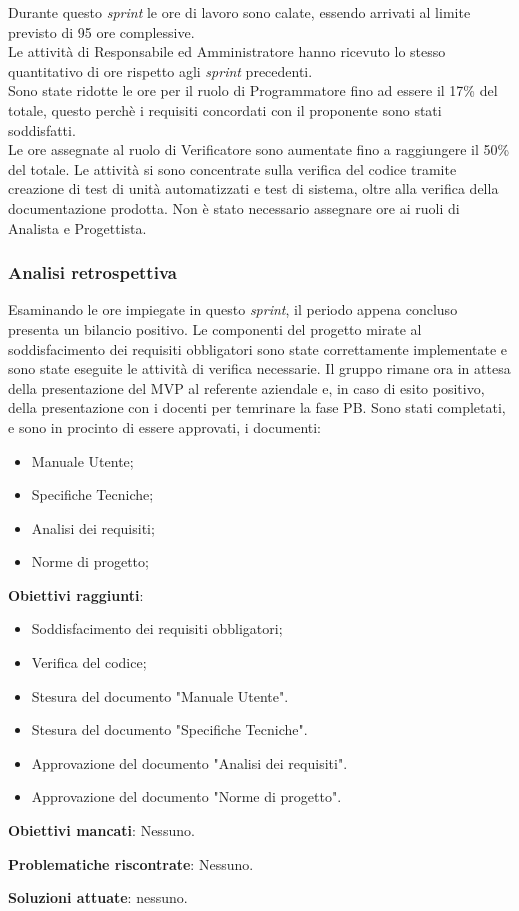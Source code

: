 Durante questo \textit{sprint} le ore di lavoro sono calate, essendo arrivati al limite previsto di 95 ore complessive.\\
Le attività di Responsabile ed Amministratore hanno ricevuto lo stesso quantitativo di ore rispetto agli \textit{sprint} precedenti.\\
Sono state ridotte le ore per il ruolo di Programmatore fino ad essere il 17\% del totale, questo perchè i requisiti concordati con il proponente sono stati soddisfatti.\\
Le ore assegnate al ruolo di Verificatore sono aumentate fino a raggiungere il 50\% del totale.
Le attività si sono concentrate sulla verifica del codice tramite creazione di test di unità automatizzati e test di sistema, oltre alla verifica della documentazione prodotta.
Non è stato necessario assegnare ore ai ruoli di Analista e Progettista.

\subsubsection{Analisi retrospettiva}
Esaminando le ore impiegate in questo \textit{sprint}, il periodo appena concluso presenta un bilancio positivo.
Le componenti del progetto mirate al soddisfacimento dei requisiti obbligatori sono state correttamente implementate e sono state eseguite le attività di verifica necessarie.
Il gruppo rimane ora in attesa della presentazione del MVP al referente aziendale e, in caso di esito positivo, della presentazione con i docenti per temrinare la fase PB.
Sono stati completati, e sono in procinto di essere approvati, i documenti:
\begin{itemize}
	\item Manuale Utente;
	\item Specifiche Tecniche;
	\item Analisi dei requisiti;
	\item Norme di progetto;
\end{itemize}


\textbf{Obiettivi raggiunti}:
\begin{itemize}
	\item Soddisfacimento dei requisiti obbligatori;
	\item Verifica del codice;
	\item Stesura del documento "Manuale Utente".
	\item Stesura del documento "Specifiche Tecniche".
	\item Approvazione del documento "Analisi dei requisiti".
	\item Approvazione del documento "Norme di progetto".
\end{itemize}


\textbf{Obiettivi mancati}: Nessuno.

\textbf{Problematiche riscontrate}: Nessuno.

\textbf{Soluzioni attuate}: nessuno.